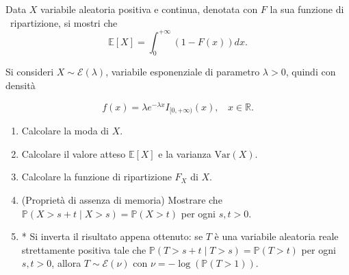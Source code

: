 Data $X$ variabile aleatoria positiva e continua, denotata con $F$ la sua funzione di \ ripartizione, si mostri che
\begin{equation*}
\mathbb{E}[ X] =\int _{0}^{+\infty }( 1-F( x)) dx.
\end{equation*}

Si consideri $X\sim \mathcal{E}( \lambda )$, variabile esponenziale di parametro $\lambda  >0$, quindi con densità


\begin{equation*}
f( x) =\lambda e^{-\lambda x} I_{[ 0,+\infty )}( x) ,\ \ \ \ x\in \mathbb{R} .
\end{equation*}
\begin{enumerate}
\item Calcolare la moda di $X$.
\item Calcolare il valore atteso $\mathbb{E}[ X]$ e la varianza $\mathrm{Var}( X)$.
\item Calcolare la funzione di ripartizione $F_{X}$ di $X$.
\item (Proprietà di assenza di memoria) Mostrare che $\mathbb{P}( X >s+t \mid X >s) =\mathbb{P}( X >t)$ per ogni $s,t >0$.
\item * Si inverta il risultato appena ottenuto: se $T$ è una variabile aleatoria reale strettamente positiva tale che $\mathbb{P}( T >s+t\mid T >s) =\mathbb{P}( T >t)$ per ogni $s,t >0$, allora $T\sim \mathcal{E}( \nu )$ con $\nu =-\log(\mathbb{P}( T >1))$.
\end{enumerate}

